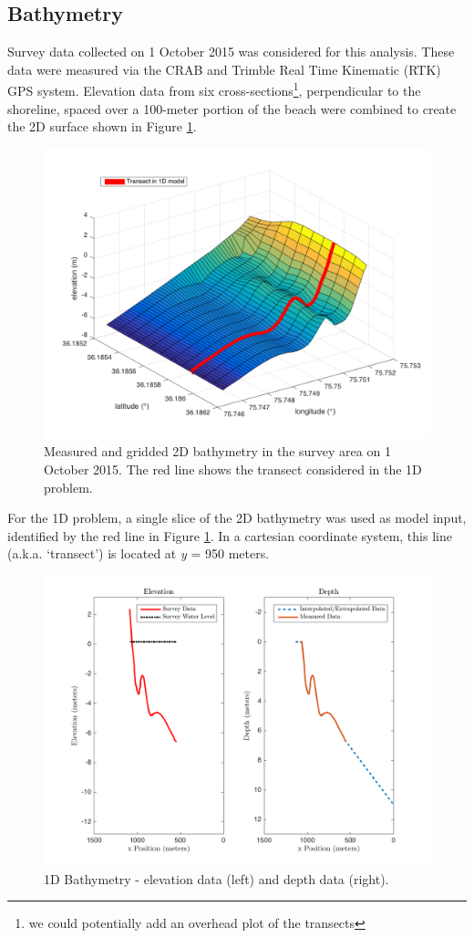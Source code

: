 \subsection{Bathymetry}
\label{sec: bathy}

	Survey data collected on 1 October 2015 was considered for this analysis. These data were measured via the CRAB and Trimble Real Time Kinematic (RTK) GPS system. Elevation data from six cross-sections\footnote{we could potentially add an overhead plot of the transects}, perpendicular to the shoreline, spaced over a 100-meter portion of the beach were combined to create the 2D surface shown in Figure \ref{2D Bath}. 
	
	 	\begin{figure}[H]
	 	\centering
	 	\includegraphics[width=0.6\linewidth]{img/trueBath2D.png}
	 	\caption{Measured and gridded 2D bathymetry in the survey area on 1 October 2015. The red line shows the transect considered in the 1D problem.}
	 	\label{2D Bath}
	 	\end{figure}
	
	For the 1D problem, a single slice of the 2D bathymetry was used as model input, identified by the red line in Figure \ref{2D Bath}. In a cartesian coordinate system, this line (a.k.a. `transect') is located at \textit{y} = 950 meters. 
		
		\begin{figure}[H]
		\centering
		\includegraphics[width = 1.0\linewidth]{img/trueBath1D.png}
		\caption{1D Bathymetry - elevation data (left) and depth data (right).}
		\label{1D Bath}
		\end{figure}
		
